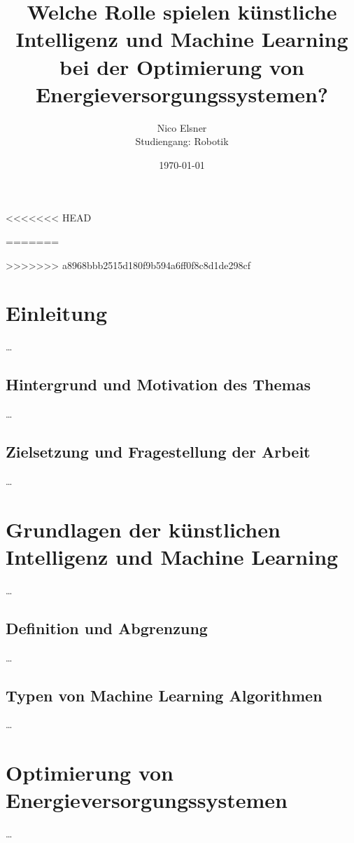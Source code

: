 \documentclass[
11pt, 
a4paper,
DIV = 14,
twoside,
twocolumn, %
parskip =half, %
headsepline, %
openright, %
]{scrreprt}
\begin{document}
	
	\title{Welche Rolle spielen künstliche Intelligenz und Machine Learning bei der Optimierung von Energieversorgungssystemen?}
	\author{Nico Elsner\\
		Studiengang: Robotik}
	\date{\today}
	\maketitle
<<<<<<< HEAD

	\clearpage
	\begingroup
	  \pagestyle{empty}
	  \renewcommand*\chapterpagestyle{empty}
	  \tableofcontents 
	\clearpage
	\endgroup
=======
	\tableofcontents
	\thispagestyle{empty}

>>>>>>> a8968bbb2515d180f9b594a6ff0f8c8d1de298cf
	\chapter{Einleitung}
	\setcounter{page}{1}
	\ldots
	\section{Hintergrund und Motivation des Themas}
	\ldots
	\section{Zielsetzung und Fragestellung der Arbeit}
	\ldots


	\chapter{Grundlagen der künstlichen Intelligenz und Machine Learning}
	\ldots
	\section{Definition und Abgrenzung}
	\ldots
	\section{Typen von Machine Learning Algorithmen}
	\ldots


	\chapter{Optimierung von Energieversorgungssystemen}
	\ldots
\end{document}
